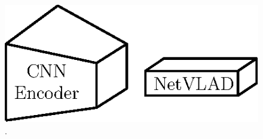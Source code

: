\begin{figure}
	\centering
	
	\includegraphics[width=\linewidth]{related_work/enc+vlad}
	
	\caption[]{\label{fig:cnn_aggregation} \textbf{} .}	
	
\end{figure}